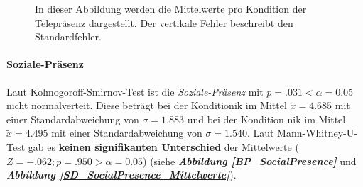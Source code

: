 \documentclass[a4paper,11pt]{article}%
\renewcommand{\\}{\vspace*{0.5\baselineskip} \newline}
\begin{document}
\begin{figure}[H]
\begin{minipage}[t]{.5\linewidth}
      \caption[Durchschnittlich \textit{wahrgenommene Telepräsenz}]{In dieser Abbildung werden die Mittelwerte pro Kondition der Telepräsenz dargestellt. Der vertikale Fehler beschreibt den Standardfehler.}
       \label{SD_Telepresence_Mittelwerte}
   \end{minipage}
\end{figure}


\paragraph{Soziale-Präsenz} 
Laut Kolmogoroff-Smirnov-Test ist die \textit{Soziale-Präsenz} mit $p = .031 < \alpha = 0.05$ nicht normalverteit. 
Diese beträgt bei der Kondition\newline \ac{ik} im Mittel $\tilde x = 4.685$ mit einer Standardabweichung von $\sigma = 1.883$ und
bei der Kondition \ac{nik} im Mittel $\tilde x = 4.495$ mit einer Standardabweichung von $\sigma = 1.540$. 
Laut Mann-Whitney-U-Test gab es \textbf{keinen signifikanten Unterschied} der Mittelwerte ($ Z = -.062; p = .950 > \alpha = 0.05$) (siehe \textbf{\textit{Abbildung \ref{BP_SocialPresence}}} und \textbf{\textit{Abbildung \ref{SD_SocialPresence_Mittelwerte}}}).
	
\end{document}
